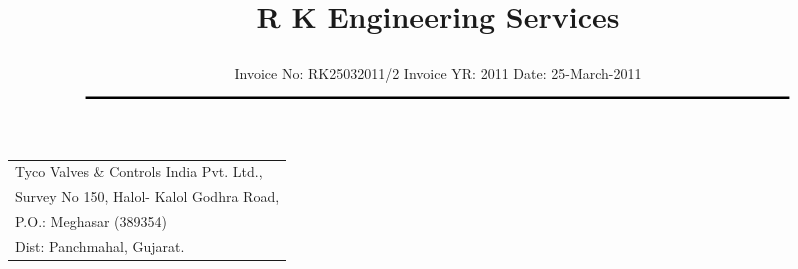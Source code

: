 \documentclass[11pt]{article}
\title{\vspace*{-1.5cm} \centerline{ \Huge \bf \hspace{0cm} R K Engineering Services}\vspace*{-0.75cm}}
\author{%
 \scriptsize Invoice No: RK25032011/2  \hspace*{4cm}  Invoice YR: 2011 \hspace*{4cm} Date: 25-March-2011\\
$\rule{7.0in}{0.5mm}$}
\date{}
\begin{document}
\maketitle
\thispagestyle{empty}
\vspace*{0.5cm}	
\begin{flushleft}
{\footnotesize
\begin{tabular}{l}
Tyco Valves \& Controls India Pvt. Ltd.,\\
Survey No 150, Halol- Kalol Godhra Road,\\
P.O.:  Meghasar (389354)\\
Dist: Panchmahal, Gujarat.\\
\end{tabular}
}
\end{flushleft}

\vspace*{1cm}

\vspace*{0.5cm}

\end{document}
